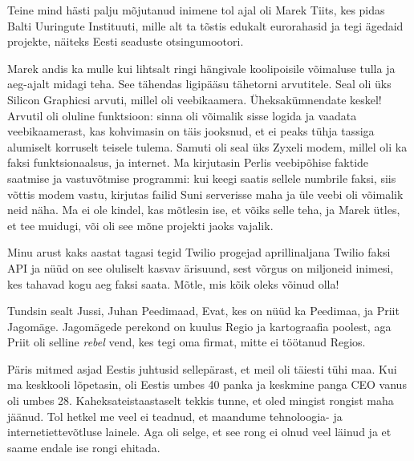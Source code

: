 Teine mind hästi palju mõjutanud inimene tol ajal oli Marek 
Tiits, kes pidas Balti Uuringute 
Instituuti, mille alt ta tõstis edukalt 
eurorahasid ja tegi ägedaid projekte, näiteks Eesti seaduste 
otsingumootori.

Marek andis ka mulle kui lihtsalt ringi hängivale 
koolipoisile võimaluse tulla ja aeg-ajalt midagi teha. See tähendas 
ligipääsu tähetorni arvutitele. Seal oli üks Silicon Graphicsi 
arvuti, millel oli veebikaamera. Üheksakümnendate keskel! Arvutil oli oluline 
funktsioon: sinna oli võimalik sisse logida ja vaadata veebikaamerast, kas 
kohvimasin on täis jooksnud, et ei peaks tühja tassiga alumiselt korruselt 
teisele tulema. Samuti oli seal üks Zyxeli modem, 
millel oli ka faksi funktsionaalsus, ja internet. Ma 
kirjutasin Perlis veebipõhise faktide saatmise ja vastuvõtmise programmi: kui keegi saatis sellele numbrile faksi, siis võttis 
modem vastu, kirjutas failid Suni serverisse maha ja üle veebi oli 
võimalik neid näha. Ma ei ole kindel, kas mõtlesin ise, et võiks selle teha, ja Marek ütles, et tee muidugi, või oli see 
mõne projekti jaoks vajalik.


Minu arust kaks aastat tagasi 
tegid Twilio progejad aprillinaljana Twilio faksi API ja 
nüüd on see oluliselt kasvav ärisuund, sest võrgus on 
miljoneid inimesi, kes tahavad kogu aeg faksi saata. Mõtle, mis kõik oleks 
võinud olla! 


Tundsin sealt Jussi, Juhan Peedimaad, Evat, 
kes on nüüd ka Peedimaa, ja Priit 
Jagomäge. Jagomägede perekond on kuulus Regio ja 
kartograafia poolest, aga Priit oli selline \emph{rebel} vend, kes tegi oma firmat,
mitte ei töötanud Regios. 

Päris mitmed asjad Eestis juhtusid sellepärast, et 
meil oli täiesti tühi maa. Kui ma keskkooli 
lõpetasin, oli Eestis umbes 40 panka ja keskmine panga CEO vanus oli umbes 28. 
Kaheksateistaastaselt tekkis tunne, et oled mingist rongist maha jäänud. Tol hetkel me veel ei teadnud, et 
maandume tehnoloogia- ja internetiettevõtluse lainele. Aga oli selge, 
et see rong ei olnud veel läinud ja et saame endale ise rongi ehitada. 

